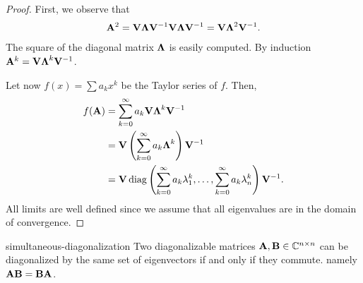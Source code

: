 \begin{proof}
  First, we observe that
  \begin{gather}
    \mathbf A^2 = \mathbf V \boldsymbol\Lambda \mathbf V^{-1} \mathbf V \boldsymbol\Lambda \mathbf V^{-1}
    = \mathbf V \boldsymbol\Lambda^2 \mathbf V^{-1}.
  \end{gather}
  The square of the diagonal matrix $\boldsymbol\Lambda$ is easily computed.
  By induction $\mathbf A^k =  \mathbf V \boldsymbol\Lambda^k \mathbf V^{-1}$.

  Let now $f(x) = \sum a_k x^k$ be the Taylor series of $f$. Then,
  \begin{gather}
    \begin{split}
      f(\mathbf A)
      &= \sum_{k=0}^\infty a_k  \mathbf V \boldsymbol\Lambda^k \mathbf V^{-1}\\
      &= \mathbf V \left(\sum_{k=0}^\infty a_k \boldsymbol\Lambda^k\right) \mathbf V^{-1}\\
      &= \mathbf V \operatorname{diag}\left(
        \sum_{k=0}^\infty a_k \lambda_1^k,\dots,
        \sum_{k=0}^\infty a_k\lambda_n^k
      \right)  \mathbf V^{-1}.
    \end{split}
  \end{gather}
  All limits are well defined since we assume that all eigenvalues are
  in the domain of convergence.
\end{proof}

\begin{Theorem}{simultaneous-diagonalization}
  Two diagonalizable matrices $\mathbf A, \mathbf B\in \mathbb C^{n\times n}$ can be
  diagonalized by the same set of eigenvectors if and only if they
  commute. namely $\mathbf A\mathbf B = \mathbf B\mathbf A$.
\end{Theorem}

